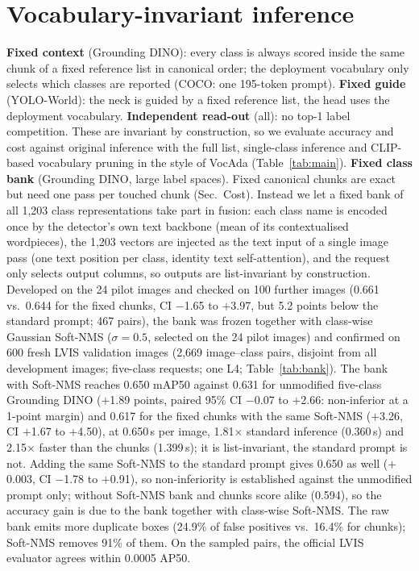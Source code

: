 \documentclass[10pt,twocolumn,letterpaper]{article}
\begin{document}
\section{Vocabulary-invariant inference}\label{sec:inv}
\textbf{Fixed context} (Grounding DINO): every class is always scored inside the same chunk of a fixed reference list in
canonical order; the deployment vocabulary only selects which classes are reported (COCO: one 195-token prompt).
\textbf{Fixed guide} (YOLO-World): the neck is guided by a fixed reference list, the head uses the deployment vocabulary.
\textbf{Independent read-out} (all): no top-1 label competition. These are invariant by construction, so we evaluate
accuracy and cost against original inference with the full list, single-class inference and CLIP-based vocabulary
pruning in the style of VocAda (Table~\ref{tab:main}).
\textbf{Fixed class bank} (Grounding DINO, large label spaces). Fixed canonical chunks are exact but need one pass per touched chunk (Sec.~Cost). Instead we let a fixed bank of all 1{,}203 class representations take part in fusion: each class name is encoded once by the detector's own text backbone (mean of its contextualised
wordpieces), the 1{,}203 vectors are injected as the text input of a single image pass (one text position per class,
identity text self-attention), and the request only selects output columns, so outputs are list-invariant by
construction. Developed on the 24 pilot images and checked on 100 further images (0.661 vs.\ 0.644 for the fixed
chunks, CI $-$1.65 to $+$3.97, but 5.2 points below the standard prompt; 467 pairs), the bank was frozen together with class-wise Gaussian Soft-NMS ($\sigma{=}0.5$, selected on the 24
pilot images) and confirmed on
600 fresh LVIS validation images (2{,}669 image--class pairs, disjoint from all development images; five-class
requests; one L4; Table~\ref{tab:bank}). The bank with Soft-NMS reaches 0.650 mAP50 against 0.631 for unmodified
five-class Grounding DINO ($+$1.89 points, paired 95\% CI $-$0.07 to $+$2.66: non-inferior at a 1-point margin) and
0.617 for the fixed chunks with the same Soft-NMS ($+$3.26, CI $+$1.67 to $+$4.50), at 0.650\,s per image, 1.81$\times$
standard inference (0.360\,s) and 2.15$\times$ faster than the chunks (1.399\,s); it is list-invariant, the standard
prompt is not. Adding the same Soft-NMS to the standard prompt gives 0.650 as well ($+$0.003, CI $-$1.78 to $+$0.91), so
non-inferiority is established against the unmodified prompt only; without Soft-NMS bank and chunks score alike
(0.594), so the accuracy gain is due to the bank together with class-wise Soft-NMS. The raw bank emits more duplicate boxes (24.9\% of false positives vs.\ 16.4\% for chunks); Soft-NMS removes 91\% of them. On the sampled pairs, the official LVIS evaluator agrees within 0.0005 AP50.
\end{document}
